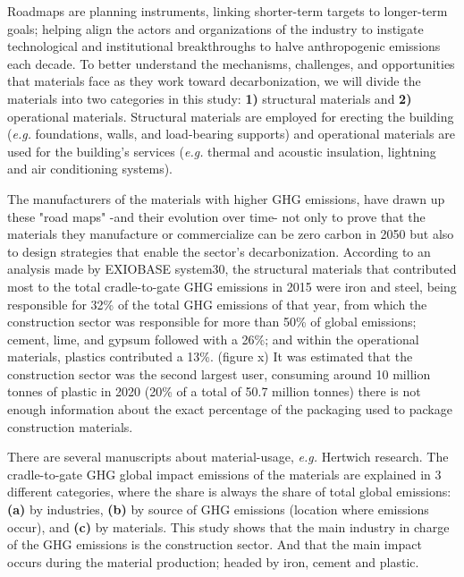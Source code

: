 Roadmaps are planning instruments, linking shorter-term targets to longer-term goals; helping align the actors and organizations of the industry to instigate technological and institutional breakthroughs to halve anthropogenic emissions each decade.\autocite{rockstrom2017roadmap} To better understand the mechanisms, challenges, and opportunities that materials face as they work toward decarbonization, we will divide the materials into two categories in this study: \textbf{1)} structural materials and \textbf{2)} operational materials. Structural materials are employed for erecting the building (\textit{e.g.} foundations, walls, and load-bearing supports) and operational materials are used for the building’s services (\textit{e.g.} thermal and acoustic insulation, lightning and air conditioning systems).

The manufacturers of the materials with higher GHG emissions, have drawn up these "road maps" -and their evolution over time- not only to prove that the materials they manufacture or commercialize can be zero carbon in 2050 but also to design strategies that enable the sector’s decarbonization.\autocite{aus_2022} According to an analysis made by EXIOBASE system30, the structural materials that contributed most to the total cradle-to-gate GHG emissions in 2015 were iron and steel, being responsible for 32\% of the total GHG emissions of that year, from which the construction sector was responsible for more than 50\% of global emissions;\autocite{worldsteelassociation_2020} cement, lime, and gypsum followed with a 26\%; and within the operational materials, plastics contributed a 13\%.\autocite{hertwich2019material} (figure x) It was estimated that the construction sector was the second largest user, consuming around 10 million tonnes of plastic in 2020 (20\% of a total of 50.7 million tonnes\autocite{plasticseurpo_2021}) there is not enough information about the exact percentage of the packaging used to package construction materials.\autocite{geyer2017production}

There are several manuscripts about material-usage, \textit{e.g.} Hertwich research.\autocite{asbp_2020} The cradle-to-gate GHG global impact emissions of the materials are explained in 3 different categories, where the share is always the share of total global emissions: \textbf{(a)} by industries, \textbf{(b)} by source of GHG emissions (location where emissions occur), and \textbf{(c)} by materials. This study shows that the main industry in charge of the GHG emissions is the construction sector. And that the main impact occurs during the material production; headed by iron, cement and plastic.

